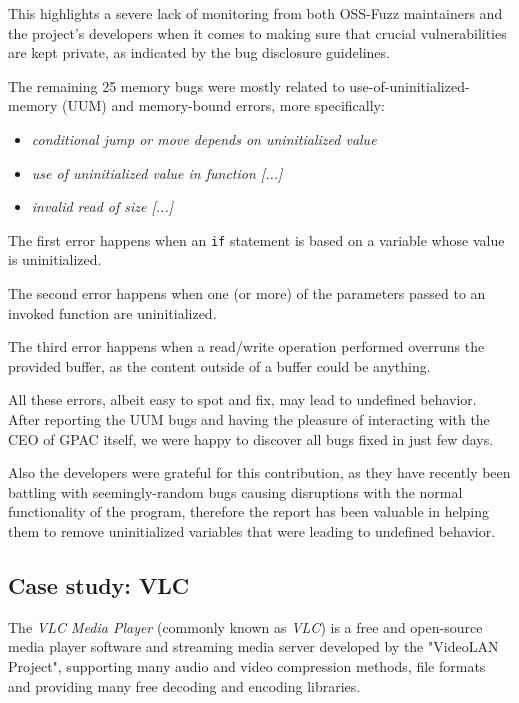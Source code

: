 This highlights a severe lack of monitoring from both OSS-Fuzz maintainers and the project's developers when it comes to making sure that crucial vulnerabilities are kept private, as indicated by the bug disclosure guidelines.

The remaining 25 memory bugs were mostly related to use-of-uninitialized-memory (UUM) and memory-bound errors, more specifically:
\begin{itemize}
    \item \textit{conditional jump or move depends on uninitialized value}
    \item \textit{use of uninitialized value in function [...]}
    \item \textit{invalid read of size [...]}
\end{itemize}
The first error happens when an \verb|if| statement is based on a variable whose value is uninitialized.

The second error happens when one (or more) of the parameters passed to an invoked function are uninitialized.

The third error happens when a read/write operation performed overruns the provided buffer, as the content outside of a buffer could be anything.

All these errors, albeit easy to spot and fix, may lead to undefined behavior.
After reporting the UUM bugs and having the pleasure of interacting with the CEO of GPAC itself, we were happy to discover all bugs fixed in just few days.

Also the developers were grateful for this contribution, as they have recently been battling with seemingly-random bugs causing disruptions with the normal functionality of the program, therefore the report has been valuable in helping them to remove uninitialized variables that were leading to undefined behavior.



\subsection{Case study: VLC}
The \textit{VLC Media Player} (commonly known as \textit{VLC}) \cite{vlc} is a free and open-source media player software and streaming media server developed by the "VideoLAN Project", supporting many audio and video compression methods, file formats and providing many free decoding and encoding libraries.

